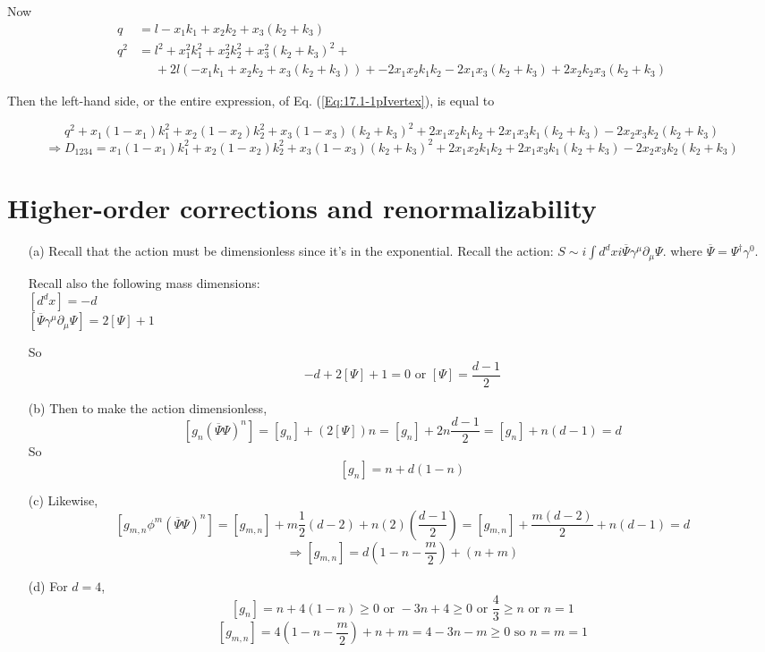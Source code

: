 \documentclass[twoside]{amsart}
\newcommand{\solutionhead}[1]
  {\smallskip
   \noindent{\large\bf Solution #1.}
   }
\begin{document}
Now
\[
\begin{aligned}
  q & = l - x_1 k_1 + x_2 k_2 + x_3 (k_2 + k_3) \\
  q^2 & = l^2 +  x_1^2 k_1^2 + x_2^2 k_2^2 + x_3^2 (k_2+ k_3)^2 + \\
  & \phantom{ = } + 2l (-x_1 k_1 + x_2 k_2 + x_3 (k_2 + k_3) ) + -2 x_1 x_2 k_1 k_2 - 2x_1 x_3 (k_2 + k_3) + 2x_2 k_2 x_3 (k_2 +k_3)
\end{aligned}
\]

Then the left-hand side, or the entire expression, of Eq. (\ref{Eq:17.1-1pIvertex}), is equal to 

\[
q^2 + x_1(1-x_1) k_1^2 + x_2(1-x_2) k_2^2 + x_3(1-x_3) (k_2 + k_3)^2 + 2x_1 x_2 k_1 k_2 + 2 x_1 x_3 k_1 (k_2 + k_3) - 2x_2 x_3 k_2 (k_2 + k_3)
\]
\[
\Longrightarrow \boxed{ D_{1234} = x_1 ( 1 - x_1 ) k_1^2 + x_2 ( 1 - x_2 )k_2^2 + x_3(1-x_3) (k_2 + k_3)^2 + 2 x_1 x_2 k_1 k_2 + 2x_1 x_3 k_1(k_2+ k_3) - 2 x_2 x_3 k_2 ( k_2 + k_3) }
\]

\section{Higher-order corrections and renormalizability}

\solutionhead{18.1} 
\begin{itemize}
\item[(a)] Recall that the action must be dimensionless since it's in the exponential.  Recall the action: $S \sim i \int d^dx i \overline{\Psi} \gamma^{\mu} \partial_{\mu} \Psi$.  where $\overline{\Psi} = \Psi^{\dag} \gamma^0$. 

Recall also the following  mass dimensions: \\
$ [ d^d x ] = - d $ \\
$ [ \overline{\Psi} \gamma^{\mu} \partial_{\mu} \Psi ] = 2 [ \Psi ] +1$

So
\[
-d + 2 [ \Psi ] + 1 = 0 \text{ or }  \boxed{ [ \Psi ] = \frac{d - 1}{2} }
\]
\item[(b)]  Then to make the action dimensionless,
  \[
    [ g_n ( \overline{\Psi} \Psi )^n ] = [ g_n ] + ( 2 [ \Psi ]) n = [g_n ] + 2n \frac{d- 1}{2} = [g_n ] + n (d-1) = d
    \]
So 
\[
\boxed{ [ g_n ] = n + d(1- n) }
\]
  \item[(c)]  Likewise,
\[
[ g_{m,n} \phi^m ( \overline{\Psi} \Psi )^n  ] = [ g_{m,n} ] + m \frac{1}{2} ( d-2)+ n (2) \left( \frac{d-1}{2} \right)  = [ g_{m,n} ] + \frac{ m (d-2) }{2} + n (d-1) =d
\]
\[
\Longrightarrow [ g_{m,n} ] = d ( 1 - n - \frac{m}{2} ) + (n+m)
\]
  \item[(d)] For $d=4$, 
\[
[ g_n ] = n + 4(1- n) \geq 0 \text{ or } -3n + 4 \geq 0 \text{ or } \frac{4}{3} \geq n \text{ or } \boxed{ n =1 }
\]
\[
[ g_{m,n} ] = 4 ( 1 - n  - \frac{m}{2} ) + n + m = 4 -3n - m \geq 0  \text{ so } \boxed{ n = m = 1 }
\]
\end{itemize}
\end{document}
